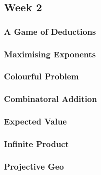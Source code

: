 \documentclass[titlepage=true]{scrartcl}
\begin{document}
    \subsection{Week 2}
    
        \subsubsection{A Game of Deductions}
            \label{2-2-1}
            
        \newpage

        \subsubsection{Maximising Exponents}
            \label{2-2-2}
            
        \newpage
            
        \subsubsection{Colourful Problem}
            \label{2-2-3}
                
        \newpage 
        
        \subsubsection{Combinatoral Addition}
            \label{2-2-4}
            
        \newpage 

        \subsubsection{Expected Value}
            \label{2-2-5}
            
        \newpage

        \subsubsection{Infinite Product}
            \label{2-2-6}
            
        \newpage

        \subsubsection{Projective Geo}
            \label{2-2-7}
            
        \newpage 
\end{document}
